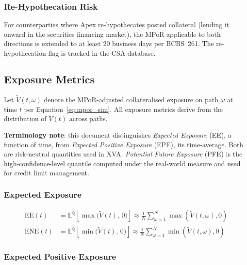 \documentclass[11pt,a4paper]{article}
\begin{document}
\subsubsection{Re-Hypothecation Risk}

For counterparties where Apex re-hypothecates posted collateral (lending it
onward in the securities financing market), the MPoR applicable to both
directions is extended to at least 20 business days per BCBS~261. The
re-hypothecation flag is tracked in the CSA database.

\subsection{Exposure Metrics}
\label{sec:metrics}

Let $\tilde{V}(t, \omega)$ denote the MPoR-adjusted collateralised exposure
on path $\omega$ at time $t$ per Equation~\eqref{eq:mpor_sim}. All
exposure metrics derive from the distribution of $\tilde{V}(t)$ across paths.

\textbf{Terminology note}: this document distinguishes \emph{Expected
Exposure} (EE), a function of time, from \emph{Expected Positive Exposure}
(EPE), its time-average. Both are risk-neutral quantities used in XVA.
\emph{Potential Future Exposure} (PFE) is the high-confidence-level quantile
computed under the real-world measure and used for credit limit management.

\subsubsection{Expected Exposure}

\begin{align}
  \text{EE}(t)  &= \mathbb{E}^{\mathbb{Q}}\!\left[\max\!\bigl(\tilde{V}(t),\, 0\bigr)\right]
    \approx \frac{1}{N}\sum_{\omega=1}^{N} \max(\tilde{V}(t,\omega), 0)
  \label{eq:ee} \\[4pt]
  \text{ENE}(t) &= \mathbb{E}^{\mathbb{Q}}\!\left[\min\!\bigl(\tilde{V}(t),\, 0\bigr)\right]
    \approx \frac{1}{N}\sum_{\omega=1}^{N} \min(\tilde{V}(t,\omega), 0)
  \label{eq:ene}
\end{align}

\subsubsection{Expected Positive Exposure}
\end{document}
